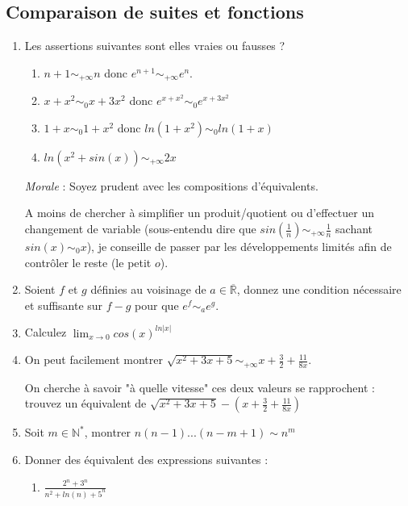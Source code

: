 \documentclass[]{article}
\begin{document}
\subsection{Comparaison de suites et fonctions}

\begin{enumerate}
\item Les assertions suivantes sont elles vraies ou fausses ?
\begin{enumerate}
	\item $n + 1 \sim_{+\infty} n$ donc $e^{n+1} \sim_{+\infty} e^n$.
	
	\item $x + x^2 \sim_0 x+3x^2$ donc $e^{x + x^2} \sim_0 e^{x + 3x^2}$
	
	\item $1+x \sim_0 1+x^2$ donc $ln(1+x^2) \sim_{0} ln(1+x)$
	
	\item $ln(x^2+sin (x)) \sim_{+\infty} 2x$
	
\end{enumerate}

\textit{Morale} : Soyez prudent avec les compositions d'équivalents.

A moins de chercher à simplifier un produit/quotient ou d'effectuer un changement de variable (sous-entendu dire que $sin\left(\frac{1}{n}\right) \sim_{+\infty} \frac{1}{n}$ sachant $sin(x) \sim_0 x$), je conseille de passer par les développements limités afin de contrôler le reste (le petit $o$).

\item Soient $f$ et $g$ définies au voisinage de $a \in \overline{\mathbb{R}}$, donnez une condition nécessaire et suffisante sur $f-g$ pour que $e^f \sim_a e^g$.

\item
Calculez $\displaystyle \lim_{x \to 0}cos(x)^{ln|x|}$

\item On peut facilement montrer $\sqrt{x^2+3x+5}\sim_{+\infty}x+\frac{3}{2}+\frac{11}{8x}$.

On cherche à savoir "à quelle vitesse" ces deux valeurs se rapprochent : trouvez un équivalent de $\sqrt{x^2+3x+5}-(x+\frac{3}{2}+\frac{11}{8x})$

\item Soit $m \in \mathbb{N}^*$, montrer $n(n-1)...(n-m+1) \sim n^m$

\item Donner des équivalent des expressions suivantes : 
\begin{enumerate}
	\item $\frac{2^n + 3^n}{n^2+ln(n)+5^n}$


\end{enumerate}
\end{enumerate}
\end{document}
